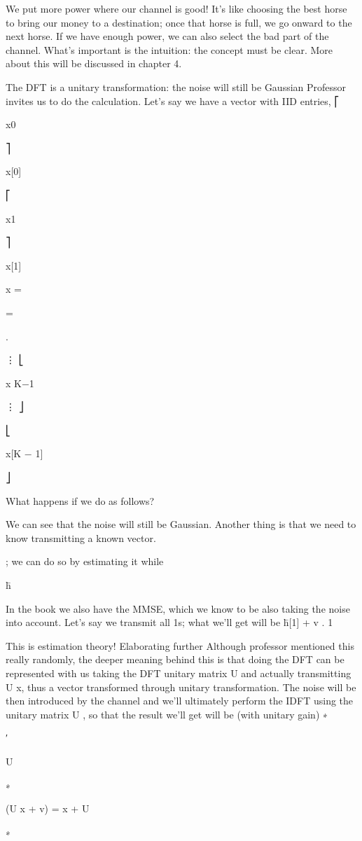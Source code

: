 {We put more power where our channel is good!
It's like choosing the best horse to bring our money to a destination; once that horse is full, we go onward to the next horse.
If we have enough power, we can also select the bad part of the channel.
What's important is the intuition: the concept must be clear.
More about this will be discussed in chapter 4.

The DFT is a unitary transformation: the noise will still be Gaussian Professor invites us to do the calculation. Let's say we have a vector with IID entries,
⎡

x0

⎤

x[0]

⎡

x1

⎤

x[1]

x =

=

.

⋮
⎣

x K−1

⋮
⎦

⎣

x[K − 1]

⎦

What happens if we do as follows?

We can see that the noise will still be Gaussian.
Another thing is that we need to know transmitting a known vector.

; we can do so by estimating it while

h̄

In the book we also have the MMSE, which we know to be also taking the noise into account.
Let's say we transmit all 1s; what we'll get will be h̄[1] + v .
1

This is estimation theory!
​Elaborating further Although professor mentioned this really randomly, the deeper meaning behind this is that doing the DFT can be represented with us taking the DFT unitary matrix U and actually transmitting U x, thus a vector transformed through unitary transformation.
The noise will be then introduced by the channel and we'll ultimately perform the IDFT using the unitary matrix U , so that the result we'll get will be (with unitary gain)
∗

′

U

∗

(U x + v) = x + U

∗

}

